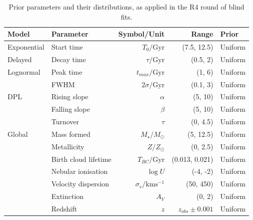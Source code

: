 \documentclass[a4paper,11pt]{article}
\begin{document}
\begin{table}
  \centering
  \begin{tabular}{l l r r l}
    Model       & Parameter            & Symbol/Unit                  & Range             & Prior   \\
    \hline \hline
    Exponential & Start time           & $T_0/\mathrm{Gyr}$           & (7.5, 12.5)       & Uniform \\
    Delayed     & Decay time           & $\tau/\mathrm{Gyr}$          & (0.5, 2)          & Uniform \\
    \hline
    Lognormal   & Peak time            & $t_{max}/\mathrm{Gyr}$       & (1, 6)            & Uniform \\
                & FWHM                 & $2\sigma/\mathrm{Gyr}$       & (0.1, 3)          & Uniform \\
    \hline
    DPL         & Rising slope         & $\alpha$                     & (5, 10)           & Uniform \\
                & Falling slope        & $\beta$                      & (5, 10)           & Uniform \\
                & Turnover             & $\tau$                       & (0, 4.5)          & Uniform \\
    \hline
    Global      & Mass formed          & $M_\star/M_\odot$            & (5, 12.5)         & Uniform \\
                & Metallicity          & $Z/Z_\odot$                  & (0, 2.5)          & Uniform \\
                & Birth cloud lifetime & $T_{BC}/\mathrm{Gyr}$        & (0.013, 0.021)    & Uniform \\
                & Nebular ionisation   & $\log{U}$                    & (-4, -2)          & Uniform \\
                & Velocity dispersion  & $\sigma_v/\mathrm{kms^{-1}}$ & (50, 450)         & Uniform \\
                & Extinction           & $A_V$                        & (0, 2)            & Uniform \\
                & Redshift             & $z$                          & $z_{obs}\pm0.001$ & Uniform \\
    \hline
  \end{tabular}
  \caption{Prior parameters and their distributions, as applied in the R4 round of blind fits.}
  \label{tab:r4_priors}
\end{table}
\end{document}
